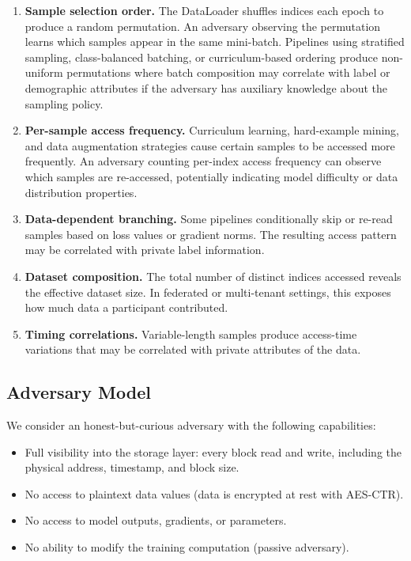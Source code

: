 \documentclass{llncs}
\begin{document}
\begin{enumerate}[label=\textbf{(\alph*)}, nosep]
    \item \textbf{Sample selection order.}
    The DataLoader shuffles indices each epoch to produce a random permutation.
    An adversary observing the permutation learns which samples appear in the same mini-batch.
    Pipelines using stratified sampling, class-balanced batching, or curriculum-based ordering produce non-uniform permutations where batch composition may correlate with label or demographic attributes if the adversary has auxiliary knowledge about the sampling policy.

    \item \textbf{Per-sample access frequency.}
    Curriculum learning, hard-example mining, and data augmentation strategies cause certain samples to be accessed more frequently.
    An adversary counting per-index access frequency can observe which samples are re-accessed, potentially indicating model difficulty or data distribution properties.

    \item \textbf{Data-dependent branching.}
    Some pipelines conditionally skip or re-read samples based on loss values or gradient norms.
    The resulting access pattern may be correlated with private label information.

    \item \textbf{Dataset composition.}
    The total number of distinct indices accessed reveals the effective dataset size.
    In federated or multi-tenant settings, this exposes how much data a participant contributed.

    \item \textbf{Timing correlations.}
    Variable-length samples produce access-time variations that may be correlated with private attributes of the data.
\end{enumerate}

\subsection{Adversary Model}

We consider an honest-but-curious adversary with the following capabilities:
\begin{itemize}[nosep]
    \item Full visibility into the storage layer: every block read and write, including the physical address, timestamp, and block size.
    \item No access to plaintext data values (data is encrypted at rest with AES-CTR).
    \item No access to model outputs, gradients, or parameters.
    \item No ability to modify the training computation (passive adversary).
\end{itemize}
\end{document}
